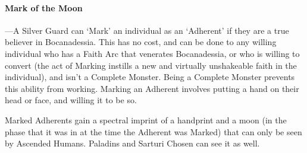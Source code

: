 \documentclass[oneside,11pt,english]{book}
\begin{document}
\paragraph{Mark of the Moon}
---\quad A Silver Guard can ‘Mark’ an individual as an ‘Adherent’ if they are a true believer in 
Bocanadessia. This has no cost, and can be done to any willing individual who has a Faith Arc 
that venerates Bocanadessia, or who is willing to convert (the act of Marking instills a new and 
virtually unshakeable faith in the individual), and isn't a Complete Monster. Being a Complete 
Monster prevents this ability from working. Marking an Adherent involves putting a hand on 
their head or face, and willing it to be so. 

Marked Adherents gain a spectral imprint of a handprint and a moon (in the phase that it was in at the time the Adherent was Marked) that can only be seen by Ascended Humans. Paladins and 
Sarturi Chosen can see it as well. 
\end{document}
